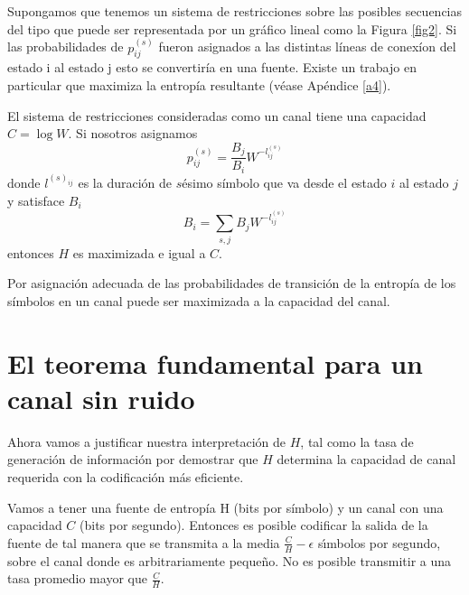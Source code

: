 Supongamos que tenemos un sistema de restricciones sobre las posibles
secuencias del tipo que puede ser representada por un gr\'afico lineal
como la Figura \ref{fig2}. Si las probabilidades de $p^{(s)}_{ij}$
fueron asignados a las distintas l\'ineas de conex\'ion del estado i
al estado j esto se convertir\'ia en una fuente.  Existe un trabajo en
particular que maximiza la entrop\'ia resultante (v\'ease Ap\'endice
\ref{a4}).

\begin{theorem}
El sistema de restricciones consideradas como un canal tiene una
capacidad $C=\log W$.  Si nosotros asignamos
\begin{equation}
p^{(s)}_{ij}=\frac{B_{j}}{B_{i}}W^{-l^{(s)}_{ij}}
\end{equation}
donde $l^{(s)_{ij}}$ es la duraci\'on de $s$\'{e}simo s\'imbolo que va
desde el estado $i$ al estado $j$ y satisface $B_{i}$
\begin{equation}
B_{i}=\sum_{s,j} B_{j}W^{-l^{(s)}_{ij}}
\end{equation}
entonces $H$ es maximizada e igual a $C$.
\end{theorem}

Por asignaci\'on adecuada de las probabilidades de transici\'on de la
entrop\'ia de los s\'imbolos en un canal puede ser maximizada a la
capacidad del canal.

\section{El teorema fundamental para un canal sin ruido}

Ahora vamos a justificar nuestra interpretaci\'on de $H$, tal como la
tasa de generaci\'on de informaci\'on por demostrar que $H$ determina la
capacidad de canal requerida con la codificaci\'on m\'as eficiente.

\begin{theorem}
Vamos a tener una fuente de entrop\'ia H (bits por s\'imbolo) y un
canal con una capacidad $C$ (bits por segundo). Entonces es posible
codificar la salida de la fuente de tal manera que se transmita a la
media $\frac{C}{H}-\epsilon$ s\'{\i}mbolos por segundo, sobre el canal
donde es arbitrariamente peque\~{n}o. No es posible transmitir a una
tasa promedio mayor que $\frac{C}{H}$.
\end{theorem}

